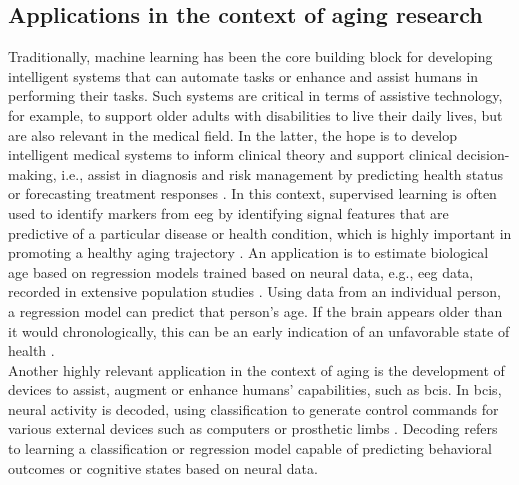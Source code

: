 \subsection{Applications in the context of aging research}
\label{theory:ml:applications_aging}
Traditionally, machine learning has been the core building block for developing intelligent systems that can automate tasks or enhance and assist humans in performing their tasks. Such systems are critical in terms of assistive technology, for example, to support older adults with disabilities to live their daily lives, but are also relevant in the medical field. In the latter, the hope is to develop intelligent medical systems to inform clinical theory and support clinical decision-making, i.e., assist in diagnosis and risk management by predicting health status or forecasting treatment responses \cite{Woo2017}. In this context, supervised learning is often used to identify markers from \gls{eeg} by identifying signal features that are predictive of a particular disease or health condition, which is highly important in promoting a healthy aging trajectory \cite{Babiloni_AlzCons2021,Mei2021}. An application is to estimate biological age based on regression models trained based on neural data, e.g., \gls{eeg} data, recorded in extensive population studies \cite{Engemann2022}. Using data from an individual person, a regression model can predict that person's age. If the brain appears older than it would chronologically, this can be an early indication of an unfavorable state of health \cite{Gonneaud2021}.\\
Another highly relevant application in the context of aging is the development of devices to assist, augment or enhance humans' capabilities, such as \glspl{bci}. In \glspl{bci}, neural activity is decoded, using classification to generate control commands for various external devices such as computers or prosthetic limbs \cite{Saha2021, Anumanchipalli2019}. Decoding refers to learning a classification or regression model capable of predicting behavioral outcomes or cognitive states based on neural data.\\
\\
